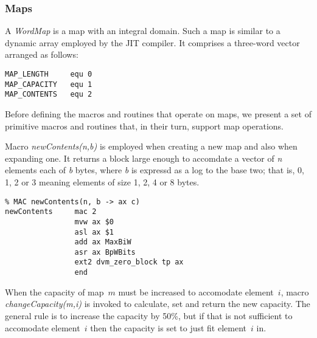 \subsubsection{Maps}
A \emph{WordMap} is a map with an integral domain. Such a map is similar to a dynamic array employed by the JIT compiler. It comprises a three-word vector arranged as follows:

\begin{tabbing}
\indents
{}
\fin
\end{tabbing}

{\small
\begin{verbatim}
MAP_LENGTH     equ 0
MAP_CAPACITY   equ 1
MAP_CONTENTS   equ 2
\end{verbatim}}

Before defining the macros and routines that operate on maps, we present a set of primitive macros and routines that, in their turn, support map operations.

Macro \emph{newContents(n,b)} is employed when creating a new map and also when expanding one. It returns a block large enough to accomdate a vector of \emph{n} elements each of \emph{b} bytes, where \emph{b} is expressd as a log to the base two; that is, 0, 1, 2 or 3 meaning elements of size 1, 2, 4 or 8 bytes.

\begin{tabbing}
\indents
{}
\fin
\end{tabbing}

{\small
\begin{verbatim}
% MAC newContents(n, b -> ax c)
newContents     mac 2
                mvw ax $0
                asl ax $1
                add ax MaxBiW
                asr ax BpWBits
                ext2 dvm_zero_block tp ax
                end
\end{verbatim}}

When the capacity of map~$m$ must be increased to accomodate element~$i$, macro \emph{changeCapacity(m,i)} is invoked to calculate, set and return the new capacity. The general rule is to increase the capacity by 50\%, but if that is not sufficient to accomodate element~$i$ then the capacity is set to just fit element~$i$ in.
\begin{tabbing}
\indents
{}
\fin
\end{tabbing}

